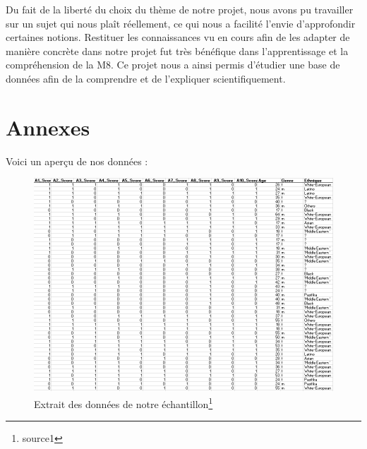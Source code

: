 \documentclass[12,french]{report}
\begin{document}
    Du fait de la liberté du choix du thème de notre projet, nous avons pu travailler sur un sujet qui nous plaît réellement, ce qui nous a facilité l’envie d’approfondir certaines notions. Restituer les connaissances vu en cours afin de les adapter de manière concrète dans notre projet fut très bénéfique dans l’apprentissage et la compréhension de la M8. 
Ce projet nous a ainsi permis d'étudier une base de données afin de la comprendre et de l'expliquer scientifiquement.

\listoffigures

\chapter*{Annexes}
Voici un aperçu de nos données :\vspace{1cm}

\begin{figure}[H]
	\centering
	\includegraphics[height=0.5\textheight]{./Images/1}\vspace{0.4cm}
	Extrait des données de notre échantillon\footnote[1]{source1}
\end{figure}\vspace{0.5cm}
\end{document}
